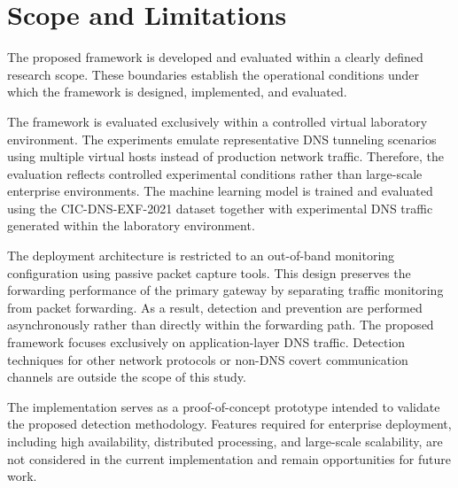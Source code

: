 \documentclass[14pt, a4paper, oneside]{report}
\begin{document}
\section{Scope and Limitations}
\label{sec:scope_limitations}

The proposed framework is developed and evaluated within a clearly defined research scope. These boundaries establish the operational conditions under which the framework is designed, implemented, and evaluated.

The framework is evaluated exclusively within a controlled virtual laboratory environment. The experiments emulate representative DNS tunneling scenarios using multiple virtual hosts instead of production network traffic. Therefore, the evaluation reflects controlled experimental conditions rather than large-scale enterprise environments. 
The machine learning model is trained and evaluated using the CIC-DNS-EXF-2021 dataset together with experimental DNS traffic generated within the laboratory environment.

The deployment architecture is restricted to an out-of-band monitoring configuration using passive packet capture tools. This design preserves the forwarding performance of the primary gateway by separating traffic monitoring from packet forwarding. As a result, detection and prevention are performed asynchronously rather than directly within the forwarding path.
The proposed framework focuses exclusively on application-layer DNS traffic. Detection techniques for other network protocols or non-DNS covert communication channels are outside the scope of this study.

The implementation serves as a proof-of-concept prototype intended to validate the proposed detection methodology. Features required for enterprise deployment, including high availability, distributed processing, and large-scale scalability, are not considered in the current implementation and remain opportunities for future work.
\end{document}
